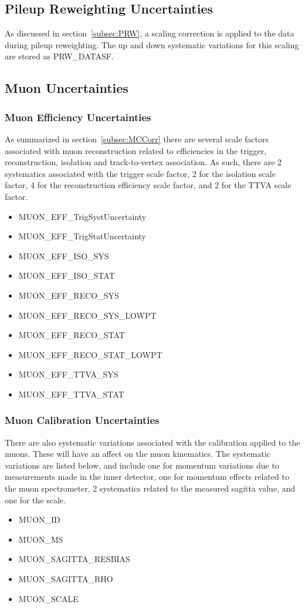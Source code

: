 \subsection{Pileup Reweighting Uncertainties}
As discussed in section~\ref{subsec:PRW}, a scaling correction is applied to the data during pileup reweighting. The up and down systematic variations for this scaling are
stored as PRW\_DATASF.

\subsection{Muon Uncertainties}

\subsubsection{Muon Efficiency Uncertainties}
As summarized in section~\ref{subsec:MCCorr} there are several scale factors associated with muon reconstruction related to efficiencies in the trigger, reconstruction, isolation and track-to-vertex association.
As such, there are 2 systematics associated with the trigger scale factor, 2 for the isolation scale factor, 4 for the reconstruction efficiency scale factor, and 2 for the TTVA scale factor.
\begin{itemize}
  \item MUON\_EFF\_TrigSystUncertainty
  \item MUON\_EFF\_TrigStatUncertainty
  \item MUON\_EFF\_ISO\_SYS
  \item MUON\_EFF\_ISO\_STAT
  \item MUON\_EFF\_RECO\_SYS
  \item MUON\_EFF\_RECO\_SYS\_LOWPT
  \item MUON\_EFF\_RECO\_STAT
  \item MUON\_EFF\_RECO\_STAT\_LOWPT
  \item MUON\_EFF\_TTVA\_SYS
  \item MUON\_EFF\_TTVA\_STAT
\end{itemize}

\subsubsection{Muon Calibration Uncertainties}
There are also systematic variations associated with the calibration applied to the muons. These will have an affect on the muon kinematics. The systematic variations are listed below, and include
one for momentum variations due to measurements made in the inner detector, one for momentum effects related to the muon spectrometer, 2 systematics related to the measured sagitta value, and one for the
scale.
\begin{itemize}
  \item MUON\_ID
  \item MUON\_MS
  \item MUON\_SAGITTA\_RESBIAS
  \item MUON\_SAGITTA\_RHO
  \item MUON\_SCALE
\end{itemize}

